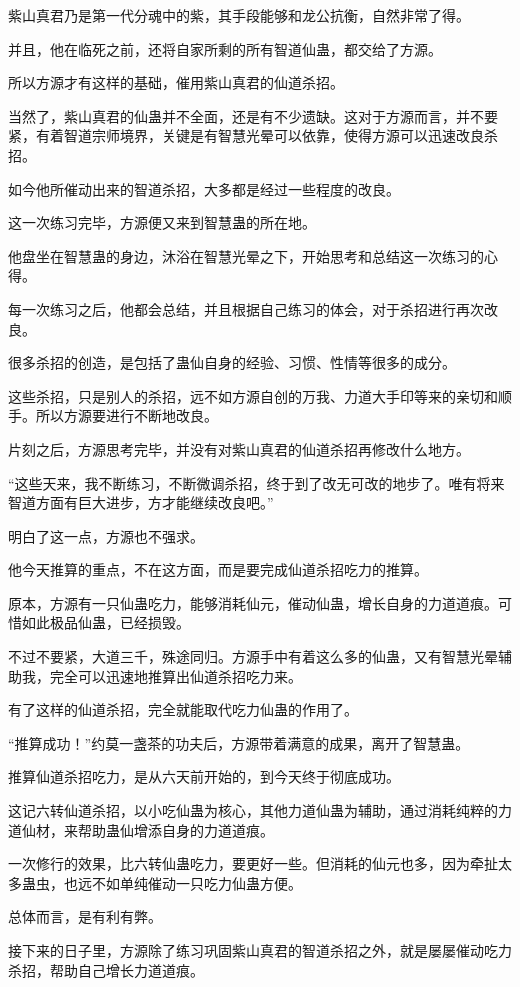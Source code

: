 \begin{this_body}
紫山真君乃是第一代分魂中的紫，其手段能够和龙公抗衡，自然非常了得。

并且，他在临死之前，还将自家所剩的所有智道仙蛊，都交给了方源。

所以方源才有这样的基础，催用紫山真君的仙道杀招。

当然了，紫山真君的仙蛊并不全面，还是有不少遗缺。这对于方源而言，并不要紧，有着智道宗师境界，关键是有智慧光晕可以依靠，使得方源可以迅速改良杀招。

如今他所催动出来的智道杀招，大多都是经过一些程度的改良。

这一次练习完毕，方源便又来到智慧蛊的所在地。

他盘坐在智慧蛊的身边，沐浴在智慧光晕之下，开始思考和总结这一次练习的心得。

每一次练习之后，他都会总结，并且根据自己练习的体会，对于杀招进行再次改良。

很多杀招的创造，是包括了蛊仙自身的经验、习惯、性情等很多的成分。

这些杀招，只是别人的杀招，远不如方源自创的万我、力道大手印等来的亲切和顺手。所以方源要进行不断地改良。

片刻之后，方源思考完毕，并没有对紫山真君的仙道杀招再修改什么地方。

“这些天来，我不断练习，不断微调杀招，终于到了改无可改的地步了。唯有将来智道方面有巨大进步，方才能继续改良吧。”

明白了这一点，方源也不强求。

他今天推算的重点，不在这方面，而是要完成仙道杀招吃力的推算。

原本，方源有一只仙蛊吃力，能够消耗仙元，催动仙蛊，增长自身的力道道痕。可惜如此极品仙蛊，已经损毁。

不过不要紧，大道三千，殊途同归。方源手中有着这么多的仙蛊，又有智慧光晕辅助我，完全可以迅速地推算出仙道杀招吃力来。

有了这样的仙道杀招，完全就能取代吃力仙蛊的作用了。

“推算成功！”约莫一盏茶的功夫后，方源带着满意的成果，离开了智慧蛊。

推算仙道杀招吃力，是从六天前开始的，到今天终于彻底成功。

这记六转仙道杀招，以小吃仙蛊为核心，其他力道仙蛊为辅助，通过消耗纯粹的力道仙材，来帮助蛊仙增添自身的力道道痕。

一次修行的效果，比六转仙蛊吃力，要更好一些。但消耗的仙元也多，因为牵扯太多蛊虫，也远不如单纯催动一只吃力仙蛊方便。

总体而言，是有利有弊。

接下来的日子里，方源除了练习巩固紫山真君的智道杀招之外，就是屡屡催动吃力杀招，帮助自己增长力道道痕。


\end{this_body}
